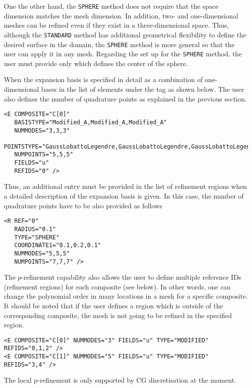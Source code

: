 One the other hand, the \texttt{SPHERE} method does not require that the space dimension matches the mesh dimension. In addition, two- and one-dimensional meshes can be refined even if they exist in a three-dimensional space. Thus, although the  \texttt{STANDARD}  method has additional geometrical flexibility to define the desired surface in the domain, the \texttt{SPHERE} method is more general so that the user can apply it in any mesh. Regarding the set up for the \texttt{SPHERE} method, the user must provide only  which defines the center of the sphere.

When the expansion basis is specified in detail as a combination of one-dimensional bases in the list of elements under the  tag as shown below. The user also defines the number of quadrature points as explained in the previous section.
\begin{lstlisting}[style=XMLStyle]
<E COMPOSITE="C[0]" 
   BASISTYPE="Modified_A,Modified_A,Modified_A" 
   NUMMODES="3,3,3" 
   POINTSTYPE="GaussLobattoLegendre,GaussLobattoLegendre,GaussLobattoLegendre" 
   NUMPOINTS="5,5,5" 
   FIELDS="u" 
   REFIDS="0" />
\end{lstlisting}

Thus, an additional entry must be provided in the list of refinement regions when a detailed description of the expansion basis is given. In this case, the number of quadrature points have to be also provided as follows 
\begin{lstlisting}[style=XMLStyle]
<R REF="0" 
   RADIUS="0.1" 
   TYPE="SPHERE"
   COORDINATE1="0.1,0.2,0.1" 
   NUMMODES="5,5,5"  
   NUMPOINTS="7,7,7" />
\end{lstlisting}

The $p$-refinement capability also allows the user to define multiple reference IDs (refinement regions) for each composite (see below). In other words, one can change the polynomial order in many locations in a mesh for a specific composite. It should be noted that if the user defines a region which is outside of the corresponding composite, the mesh is not going to be refined in the specified region. 
\begin{lstlisting}[style=XMLStyle]
<E COMPOSITE="C[0]" NUMMODES="3" FIELDS="u" TYPE="MODIFIED" REFIDS="0,1,2" />
<E COMPOSITE="C[1]" NUMMODES="5" FIELDS="u" TYPE="MODIFIED" REFIDS="3,4" />
\end{lstlisting}

The local p-refinement is only supported by CG discretisation at the moment.
